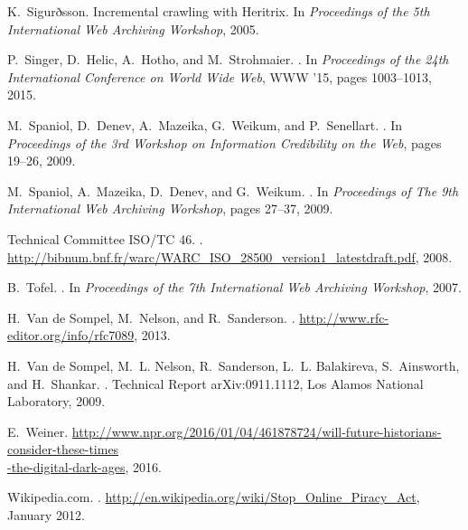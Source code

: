 \documentclass{sig-alternate}
\begin{document}
\begin{thebibliography}{10}
K.~Sigurðsson.
\newblock Incremental crawling with {Heritrix}.
\newblock In {\em Proceedings of the 5th International Web Archiving Workshop},
  2005.

P.~Singer, D.~Helic, A.~Hotho, and M.~Strohmaier.
.
\newblock In {\em Proceedings of the 24th International Conference on World
  Wide Web}, WWW '15, pages 1003--1013, 2015.

M.~Spaniol, D.~Denev, A.~Mazeika, G.~Weikum, and P.~Senellart.
.
\newblock In {\em {Proceedings of the 3rd Workshop on Information Credibility
  on the Web}}, pages 19--26, 2009.

M.~Spaniol, A.~Mazeika, D.~Denev, and G.~Weikum.
.
\newblock In {\em {Proceedings of The 9th International Web Archiving
  Workshop}}, pages 27--37, 2009.

{Technical Committee ISO/TC 46}.
.
\newblock
  \url{http://bibnum.bnf.fr/warc/WARC_ISO_28500_version1_latestdraft.pdf},
  2008.

B.~Tofel.
.
\newblock In {\em Proceedings of the 7th International Web Archiving Workshop},
  2007.

H.~{Van de Sompel}, M.~Nelson, and R.~Sanderson.
.
\newblock \url{http://www.rfc-editor.org/info/rfc7089}, 2013.

H.~{Van de Sompel}, M.~L. Nelson, R.~Sanderson, L.~L. Balakireva, S.~Ainsworth,
  and H.~Shankar.
.
\newblock Technical Report arXiv:0911.1112, Los Alamos National Laboratory,
  2009.

E.~Weiner.
\newblock
  \url{http://www.npr.org/2016/01/04/461878724/will-future-historians-consider-these-times}\\\url{-the-digital-dark-ages},
  2016.

{Wikipedia.com}.
.
\newblock \url{http://en.wikipedia.org/wiki/Stop_Online_Piracy_Act}, January
  2012.

\end{thebibliography}
\end{document}
